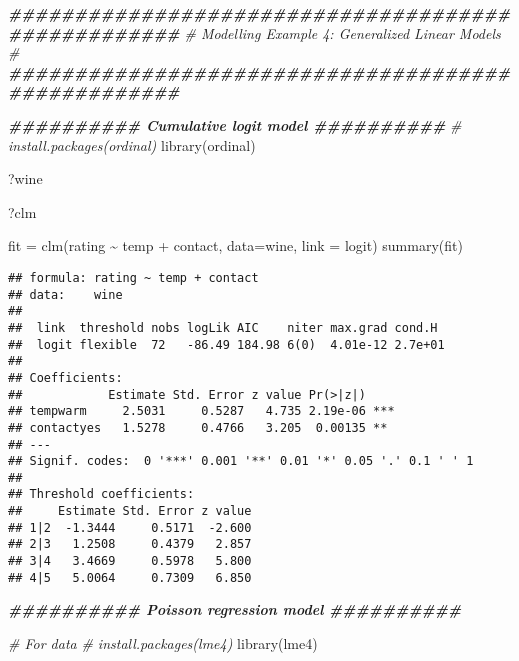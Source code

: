 \documentclass[
]{article}
\newenvironment{Shaded}{\begin{snugshade}}{\end{snugshade}}
\newcommand{\AttributeTok}[1]{\textcolor[rgb]{0.77,0.63,0.00}{#1}}
\newcommand{\CommentTok}[1]{\textcolor[rgb]{0.56,0.35,0.01}{\textit{#1}}}
\newcommand{\DocumentationTok}[1]{\textcolor[rgb]{0.56,0.35,0.01}{\textbf{\textit{#1}}}}
\newcommand{\FunctionTok}[1]{\textcolor[rgb]{0.00,0.00,0.00}{#1}}
\newcommand{\NormalTok}[1]{#1}
\newcommand{\OtherTok}[1]{\textcolor[rgb]{0.56,0.35,0.01}{#1}}
\newcommand{\SpecialCharTok}[1]{\textcolor[rgb]{0.00,0.00,0.00}{#1}}
\newcommand{\StringTok}[1]{\textcolor[rgb]{0.31,0.60,0.02}{#1}}
\begin{document}
\begin{Shaded}
\begin{Highlighting}[]
\DocumentationTok{\#\#\#\#\#\#\#\#\#\#\#\#\#\#\#\#\#\#\#\#\#\#\#\#\#\#\#\#\#\#\#\#\#\#\#\#\#\#\#\#\#\#\#\#\#\#\#\#\#\#\#}
\CommentTok{\# Modelling Example 4:  Generalized Linear Models \#}
\DocumentationTok{\#\#\#\#\#\#\#\#\#\#\#\#\#\#\#\#\#\#\#\#\#\#\#\#\#\#\#\#\#\#\#\#\#\#\#\#\#\#\#\#\#\#\#\#\#\#\#\#\#\#\#}

\DocumentationTok{\#\#\#\#\#\#\#\#\#\# Cumulative logit model \#\#\#\#\#\#\#\#\#\#}
\CommentTok{\# install.packages(\textquotesingle{}ordinal\textquotesingle{})}
\FunctionTok{library}\NormalTok{(ordinal)}

\NormalTok{?wine}

\NormalTok{?clm}

\NormalTok{fit }\OtherTok{=} \FunctionTok{clm}\NormalTok{(rating }\SpecialCharTok{\textasciitilde{}}\NormalTok{ temp }\SpecialCharTok{+}\NormalTok{ contact, }\AttributeTok{data=}\NormalTok{wine, }\AttributeTok{link =} \StringTok{\textquotesingle{}logit\textquotesingle{}}\NormalTok{)}
\FunctionTok{summary}\NormalTok{(fit)}
\end{Highlighting}
\end{Shaded}

\begin{verbatim}
## formula: rating ~ temp + contact
## data:    wine
## 
##  link  threshold nobs logLik AIC    niter max.grad cond.H 
##  logit flexible  72   -86.49 184.98 6(0)  4.01e-12 2.7e+01
## 
## Coefficients:
##            Estimate Std. Error z value Pr(>|z|)    
## tempwarm     2.5031     0.5287   4.735 2.19e-06 ***
## contactyes   1.5278     0.4766   3.205  0.00135 ** 
## ---
## Signif. codes:  0 '***' 0.001 '**' 0.01 '*' 0.05 '.' 0.1 ' ' 1
## 
## Threshold coefficients:
##     Estimate Std. Error z value
## 1|2  -1.3444     0.5171  -2.600
## 2|3   1.2508     0.4379   2.857
## 3|4   3.4669     0.5978   5.800
## 4|5   5.0064     0.7309   6.850
\end{verbatim}

\begin{Shaded}
\begin{Highlighting}[]
\DocumentationTok{\#\#\#\#\#\#\#\#\#\# Poisson regression model \#\#\#\#\#\#\#\#\#\#}

\CommentTok{\# For data}
\CommentTok{\# install.packages(\textquotesingle{}lme4\textquotesingle{})}
\FunctionTok{library}\NormalTok{(lme4)}
\end{Highlighting}
\end{Shaded}
\end{document}
